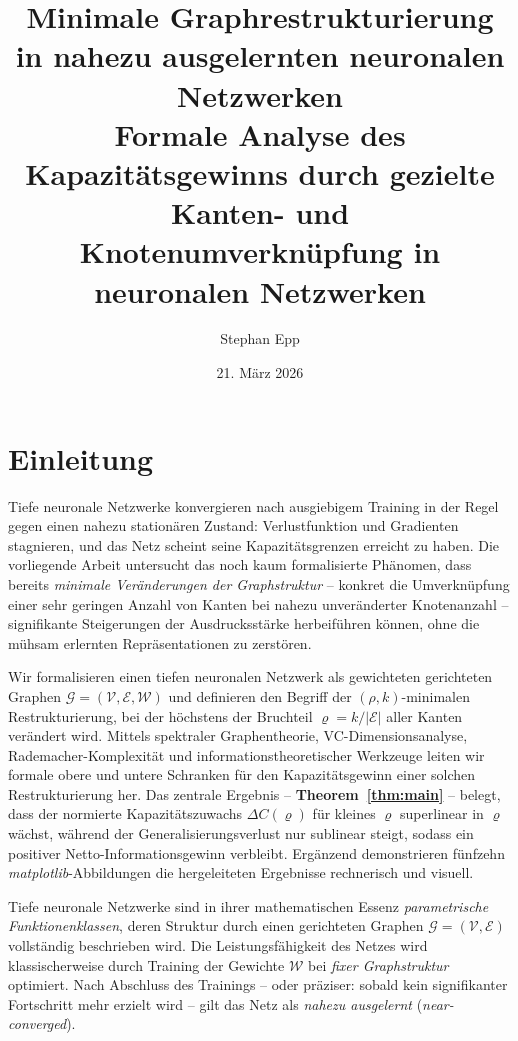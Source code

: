 \documentclass[12pt, a4paper, openany]{report}
\title{%
  \textbf{Minimale Graphrestrukturierung in nahezu ausgelernten neuronalen Netzwerken}\\
  \Large Formale Analyse des Kapazitätsgewinns durch gezielte\\
  Kanten- und Knotenumverknüpfung in neuronalen Netzwerken
}
\author{Stephan Epp}
\date{21. März 2026}
\newcommand{\calG}{\mathcal{G}}
\newcommand{\calV}{\mathcal{V}}
\newcommand{\calE}{\mathcal{E}}
\newcommand{\calW}{\mathcal{W}}
\begin{document}
\maketitle
\tableofcontents
\newpage

\chapter{Einleitung}
\label{sec:intro}
Tiefe neuronale Netzwerke konvergieren nach ausgiebigem Training in der Regel
gegen einen nahezu stationären Zustand: Verlustfunktion und Gradienten
stagnieren, und das Netz scheint seine Kapazitätsgrenzen erreicht zu haben.
Die vorliegende Arbeit untersucht das noch kaum formalisierte Phänomen, dass
bereits \emph{minimale Veränderungen der Graphstruktur} -- konkret die
Umverknüpfung einer sehr geringen Anzahl von Kanten bei nahezu unveränderter
Knotenanzahl -- signifikante Steigerungen der Ausdrucksstärke herbeiführen
können, ohne die mühsam erlernten Repräsentationen zu zerstören.

Wir formalisieren einen tiefen neuronalen Netzwerk als gewichteten gerichteten
Graphen $\calG = (\calV, \calE, \calW)$ und definieren den Begriff der
$(\rho, k)$-minimalen Restrukturierung, bei der höchstens der Bruchteil
$\varrho = k/|\calE|$ aller Kanten verändert wird.  Mittels spektraler
Graphentheorie, VC-Dimensionsanalyse, Rademacher-Komplexität und
informationstheoretischer Werkzeuge leiten wir formale obere und untere
Schranken für den Kapazitätsgewinn einer solchen Restrukturierung her.  Das
zentrale Ergebnis -- \textbf{Theorem~\ref{thm:main}} -- belegt, dass der
normierte Kapazitätszuwachs $\Delta C(\varrho)$ für kleines $\varrho$
superlinear in $\varrho$ wächst, während der Generalisierungsverlust nur
sublinear steigt, sodass ein positiver Netto-Informationsgewinn verbleibt.
Ergänzend demonstrieren fünfzehn \textit{matplotlib}-Abbildungen die
hergeleiteten Ergebnisse rechnerisch und visuell.

Tiefe neuronale Netzwerke sind in ihrer mathematischen Essenz \emph{parametrische
Funktionenklassen}, deren Struktur durch einen gerichteten Graphen
$\calG = (\calV, \calE)$ vollständig beschrieben wird.  Die Leistungsfähigkeit
des Netzes wird klassischerweise durch Training der Gewichte $\calW$ bei
\emph{fixer Graphstruktur} optimiert.  Nach Abschluss des Trainings -- oder
präziser: sobald kein signifikanter Fortschritt mehr erzielt wird -- gilt das
Netz als \emph{nahezu ausgelernt} (\textit{near-converged}).
\end{document}
